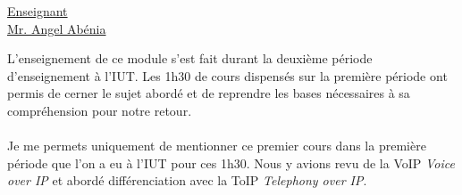 \renewcommand{\figurename}{}

\vspace*{0.2cm}%
      \large
      \href{\@orientadorPagina}{\color{black}Enseignant\\Mr. Angel Abénia}\\%
      \normalsize
\vspace*{0.5cm}%

L'enseignement de ce module s'est fait durant la deuxième période d'enseignement à l'IUT. Les 1h30 de cours dispensés sur la première période ont permis de cerner le sujet abordé et de reprendre les bases nécessaires à sa compréhension pour notre retour.
\\ \\
Je me permets uniquement de mentionner ce premier cours dans la première période que l'on a eu à l'IUT pour ces 1h30. Nous y avions revu de la VoIP \textit{Voice over IP} et abordé différenciation avec la ToIP \textit{Telephony over IP}.